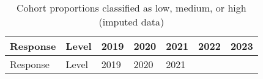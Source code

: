 \documentclass[
  single column]{article}
\begin{document}
\begin{longtable}[]{@{}
  >{\raggedright\arraybackslash}p{}
  >{\raggedright\arraybackslash}p{}
  >{\raggedright\arraybackslash}p{}
  >{\raggedright\arraybackslash}p{}
  >{\raggedright\arraybackslash}p{}
  >{\raggedright\arraybackslash}p{}
  >{\raggedright\arraybackslash}p{}@{}}
\caption{Cohort proportions classified as low, medium, or high (imputed
data)}\label{tbl-sample-cat-imp}\tabularnewline
\toprule\noalign{}
\begin{minipage}[b]{\linewidth}\raggedright
Response
\end{minipage} & \begin{minipage}[b]{\linewidth}\raggedright
Level
\end{minipage} & \begin{minipage}[b]{\linewidth}\raggedright
2019
\end{minipage} & \begin{minipage}[b]{\linewidth}\raggedright
2020
\end{minipage} & \begin{minipage}[b]{\linewidth}\raggedright
2021
\end{minipage} & \begin{minipage}[b]{\linewidth}\raggedright
2022
\end{minipage} & \begin{minipage}[b]{\linewidth}\raggedright
2023
\end{minipage} \\
\midrule\noalign{}
\endfirsthead
\toprule\noalign{}
\begin{minipage}[b]{\linewidth}\raggedright
Response
\end{minipage} & \begin{minipage}[b]{\linewidth}\raggedright
Level
\end{minipage} & \begin{minipage}[b]{\linewidth}\raggedright
2019
\end{minipage} & \begin{minipage}[b]{\linewidth}\raggedright
2020
\end{minipage} & \begin{minipage}[b]{\linewidth}\raggedright
2021
\end{minipage} & \begin{minipage}[b]{\linewidth}\raggedright

\end{minipage}
\end{longtable}
\end{document}
